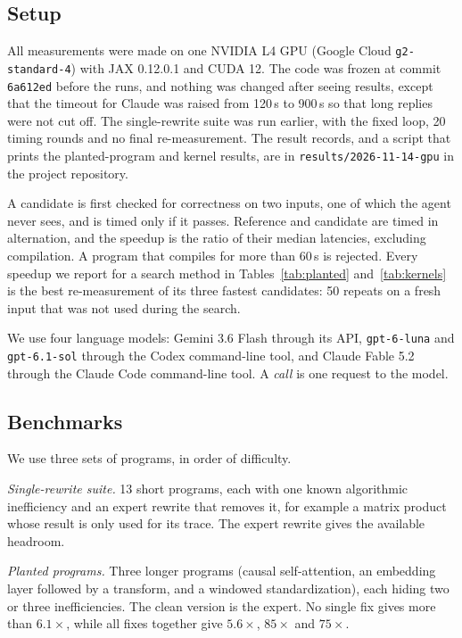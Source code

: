 \documentclass[conference]{IEEEtran}
\begin{document}
\subsection{Setup}
All measurements were made on one NVIDIA L4 GPU (Google Cloud
\texttt{g2-standard-4}) with JAX 0.12.0.1 and CUDA 12. The code was frozen at
commit \texttt{6a612ed} before the runs, and nothing was changed after seeing results,
except that the timeout for Claude was raised from 120\,s to 900\,s so that
long replies were not cut off. The single-rewrite suite was run earlier, with
the fixed loop, 20 timing rounds and no final re-measurement. The result
records, and a script that prints the planted-program and kernel results,
are in \texttt{results/2026-11-14-gpu} in the project repository.

A candidate is first checked for correctness on two inputs, one of which the
agent never sees, and is timed only if it passes. Reference and candidate are
timed in alternation, and the speedup is the ratio of their median latencies,
excluding compilation. A program that compiles for more than 60\,s is
rejected. Every speedup we report for a search method in Tables~\ref{tab:planted}
and~\ref{tab:kernels} is the best re-measurement of its three fastest
candidates: 50 repeats on a fresh input that was not used during the
search.

We use four language models: Gemini 3.6 Flash
through its API, \texttt{gpt-6-luna} and \texttt{gpt-6.1-sol} through the
Codex command-line tool, and Claude Fable 5.2 through the Claude Code command-line tool. A
\emph{call} is one request to the model.

\subsection{Benchmarks}
We use three sets of programs, in order of difficulty.

\emph{Single-rewrite suite.} 13 short programs, each with one known
algorithmic inefficiency and an expert rewrite that removes it, for example
a matrix product whose result is only used for its trace. The expert rewrite
gives the available headroom.

\emph{Planted programs.} Three longer programs (causal self-attention, an
embedding layer followed by a transform, and a windowed standardization),
each hiding two or three inefficiencies. The clean version is the expert.
No single fix gives more than $6.1\times$, while all fixes together give
$5.6\times$, $85\times$ and $75\times$.
\end{document}
